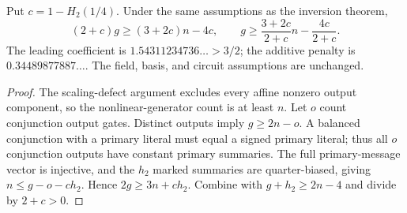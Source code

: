 \begin{theorem}
  \label{thm:lowerbounds-algebraic-geometry-inversion-entropy}
  \leanok
  Put $c=1-H_2(1/4)$. Under the same assumptions as the inversion theorem,
  \[
    (2+c)g\ge(3+2c)n-4c,
    \qquad
    g\ge\frac{3+2c}{2+c}n-\frac{4c}{2+c}.
  \]
  The leading coefficient is $1.54311234736\ldots>3/2$; the additive penalty is
  $0.34489877887\ldots$. The field, basis, and circuit assumptions are unchanged.
\end{theorem}
\begin{proof}
  \leanok
  The scaling-defect argument excludes every affine nonzero output component,
  so the nonlinear-generator count is at least $n$. Let $o$ count conjunction
  output gates. Distinct outputs imply $g\ge2n-o$. A balanced conjunction with a
  primary literal must equal a signed primary literal; thus all $o$ conjunction
  outputs have constant primary summaries. The full primary-message vector is
  injective, and the $h_2$ marked summaries are quarter-biased, giving
  $n\le g-o-ch_2$. Hence $2g\ge3n+ch_2$. Combine with
  $g+h_2\ge2n-4$ and divide by $2+c>0$.
\end{proof}

